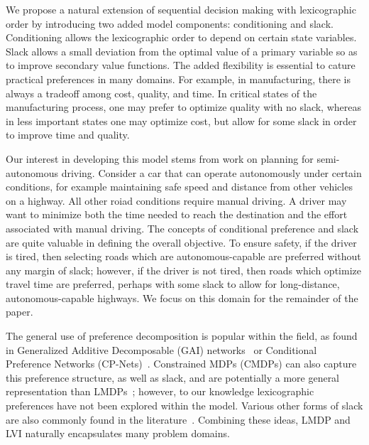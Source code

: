 We propose a natural extension of sequential decision making with lexicographic order by introducing two added model components: conditioning and slack.  Conditioning allows the lexicographic order to depend on certain state variables.  Slack allows a small deviation from the optimal value of a primary variable so as to improve secondary value functions.  The added flexibility is essential to cature practical preferences in many domains.  For example, in manufacturing, there is always a tradeoff among cost, quality, and time. In critical states of the manufacturing process, one may prefer to optimize quality with no slack, whereas in less important states one may optimize cost, but allow for some slack in order to improve time and quality. 

Our interest in developing this model stems from work on planning for semi-autonomous driving.  Consider a car that can operate autonomously under certain conditions, for example maintaining safe speed and distance from other vehicles on a highway.  All other roiad conditions require manual driving. A driver may want to minimize both the time needed to reach the destination and the effort associated with manual driving. The concepts of conditional preference and slack are quite valuable in defining the overall objective. To ensure safety, if the driver is tired, then selecting roads which are autonomous-capable are preferred without any margin of slack; however, if the driver is not tired, then roads which optimize travel time are preferred, perhaps with some slack to allow for long-distance, autonomous-capable highways. We focus on this domain for the remainder of the paper.



The general use of preference decomposition is popular within the field, as found in Generalized Additive Decomposable (GAI) networks~\cite{Gonzales11-DecisionMakingMultipleObjectivesGAINetworks} or Conditional Preference Networks (CP-Nets)~\cite{Boutilier04-CPNets}. Constrained MDPs (CMDPs) can also capture this preference structure, as well as slack, and are potentially a more general representation than LMDPs~\cite{Altman99-CMDPs}; however, to our knowledge lexicographic preferences have not been explored within the model. Various other forms of slack are also commonly found in the literature~\cite{Gabor98-MultiObjectiveReinforcementLearning}. Combining these ideas, LMDP and LVI naturally encapsulates many problem domains.


